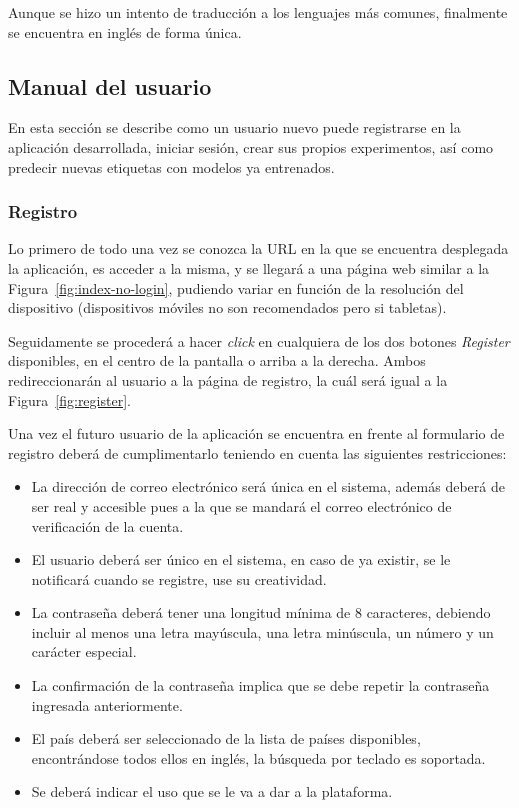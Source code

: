 Aunque se hizo un intento de traducción a los lenguajes más comunes, finalmente se encuentra en inglés de forma única.

\subsection{Manual del usuario}
En esta sección se describe como un usuario nuevo puede registrarse en la aplicación desarrollada, iniciar sesión, crear sus propios experimentos, así como predecir nuevas etiquetas con modelos ya entrenados.

\subsubsection{Registro}

Lo primero de todo una vez se conozca la URL en la que se encuentra desplegada la aplicación, es acceder a la misma, y se llegará a una página web similar a la Figura~\ref{fig:index-no-login}, pudiendo variar en función de la resolución del dispositivo (dispositivos móviles no son recomendados pero si tabletas). 


Seguidamente se procederá a hacer \textit{click} en cualquiera de los dos botones \textit{Register} disponibles, en el centro de la pantalla o arriba a la derecha. Ambos redireccionarán al usuario a la página de registro, la cuál será igual a la Figura~\ref{fig:register}.

Una vez el futuro usuario de la aplicación se encuentra en frente al formulario de registro deberá de cumplimentarlo teniendo en cuenta las siguientes restricciones:
\begin{itemize}
\item La dirección de correo electrónico será única en el sistema, además deberá de ser real y accesible pues a la que se mandará el correo electrónico de verificación de la cuenta.
\item El usuario deberá ser único en el sistema, en caso de ya existir, se le notificará cuando se registre, use su creatividad.
\item La contraseña deberá tener una longitud mínima de 8 caracteres, debiendo incluir al menos una letra mayúscula, una letra minúscula, un número y un carácter especial.
\item La confirmación de la contraseña implica que se debe repetir la contraseña ingresada anteriormente.
\item El país deberá ser seleccionado de la lista de países disponibles, encontrándose todos ellos en inglés, la búsqueda por teclado es soportada.
\item Se deberá indicar el uso que se le va a dar a la plataforma.
\end{itemize}


